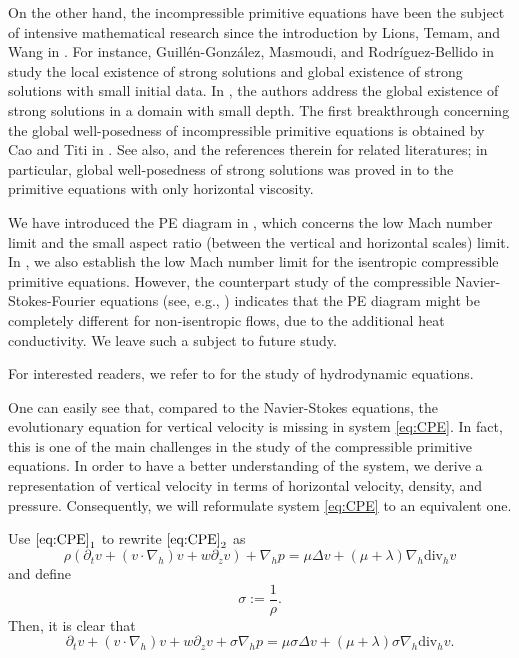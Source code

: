 \documentclass[12pt,reqno]{amsart}
\numberwithin{equation}{section}
\newcommand{\subeqref}[2]{$\eqref{#1}_{#2}$}
\begin{document}
On the other hand, the incompressible primitive equations have been the subject of intensive mathematical research since the introduction
by Lions, Temam, and Wang in \cite{Lions1992,JLLions1992}. For instance, Guill\'en-Gonz\'alez, Masmoudi, and Rodr\'iguez-Bellido in
\cite{GuillenGonzalez2001} study the local existence of strong solutions and global existence of strong solutions with small initial data. In
\cite{HuTemamZiane2003}, the authors address the global existence of strong solutions in a domain with small depth. The first breakthrough
concerning the global well-posedness of incompressible primitive equations is obtained by Cao and Titi in \cite{Cao2007}. See also,
\cite{Cao2014a,Cao2014b,Cao2016,Cao2016a,CaoLiTiti2020,CaoLiTitiWang2024,Boling,MHATK,MHTKa,GMK,IKMZ,Li2017a,LiYuan2022} and the references therein for
related literatures; in particular, global well-posedness of strong solutions was proved in \cite{Cao2016,Cao2016a,CaoLiTiti2020,CaoLiTitiWang2024} to the primitive equations with only horizontal viscosity.

We have introduced the PE diagram in \cite{LT2018LowMach1}, which concerns the low Mach number limit and the small aspect ratio (between the vertical and horizontal scales) limit. In \cite{LT2018LowMach1,LT2018LowMach2}, we also establish the low Mach number limit for the isentropic compressible primitive equations. However, the counterpart study of the compressible Navier-Stokes-Fourier equations (see, e.g., \cite{Alazard2006}) indicates that the PE diagram might be completely different for non-isentropic flows, due to the additional heat conductivity. We leave such a subject to future study.

For interested readers, we refer to \cite{Temam1977,Lions1996,Lions1998,Feireisl2004,Feireisl2009a} for the study of hydrodynamic equations.

One can easily see that, compared to the Navier-Stokes equations, the evolutionary equation for vertical velocity is missing in system
\eqref{eq:CPE}. In fact, this is one of the main challenges in the study of the compressible primitive equations. In order to have a better
understanding of the system, we derive a representation of vertical velocity in terms of horizontal velocity, density, and pressure.
Consequently, we will reformulate system \eqref{eq:CPE} to an equivalent one.

Use \subeqref{eq:CPE}{1} to rewrite \subeqref{eq:CPE}{2} as
$$
\rho(\partial_tv+(v\cdot\nabla_h)v+w\partial_zv)+\nabla_hp=\mu\Delta v+(\mu+\lambda)\nabla_h\text{div}_hv
$$
and define
\begin{equation}\label{def:rho-1}
	\sigma := \frac1\rho.
\end{equation}
Then, it is clear that
\begin{equation}
\partial_tv+(v\cdot\nabla_h)v+w\partial_zv+\sigma \nabla_hp=\mu\sigma\Delta v+(\mu+\lambda)\sigma \nabla_h\text{div}_hv. \label{EQv00}
\end{equation}
\end{document}

